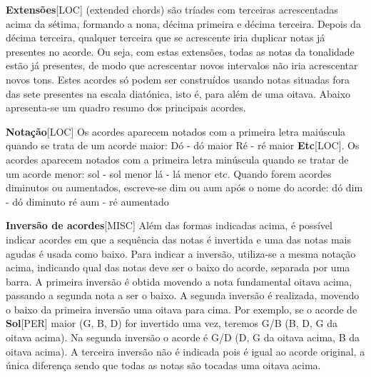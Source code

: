 \documentclass[a4paper,12pt]{article}
\begin{document}
\textbf{Extensões}\textsc{[LOC]} (extended chords) são tríades com terceiras acrescentadas acima da sétima, formando a nona, décima primeira e décima terceira. Depois da décima terceira, qualquer terceira que se acrescente iria duplicar notas já presentes no acorde. Ou seja, com estas extensões, todas as notas da tonalidade estão já presentes, de modo que acrescentar novos intervalos não iria acrescentar novos tons. Estes acordes só podem ser construídos usando notas situadas fora das sete presentes na escala diatónica, isto é, para além de uma oitava. Abaixo apresenta-se um quadro resumo dos principais acordes.

\textbf{Notação}\textsc{[LOC]} Os acordes aparecem notados com a primeira letra maiúscula quando se trata de um acorde maior: Dó - dó maior Ré - ré maior \textbf{Etc}\textsc{[LOC]}. Os acordes aparecem notados com a primeira letra minúscula quando se tratar de um acorde menor: sol - sol menor lá - lá menor etc. Quando forem acordes diminutos ou aumentados, escreve-se dim ou aum após o nome do acorde: dó dim - dó diminuto ré aum - ré aumentado

\textbf{Inversão de acordes}\textsc{[MISC]} Além das formas indicadas acima, é possível indicar acordes em que a sequência das notas é invertida e uma das notas mais agudas é usada como baixo. Para indicar a inversão, utiliza-se a mesma notação acima, indicando qual das notas deve ser o baixo do acorde, separada por uma barra. A primeira inversão é obtida movendo a nota fundamental oitava acima, passando a segunda nota a ser o baixo. A segunda inversão é realizada, movendo o baixo da primeira inversão uma oitava para cima. Por exemplo, se o acorde de \textbf{Sol}\textsc{[PER]} maior (G, B, D) for invertido uma vez, teremos G/B (B, D, G da oitava acima). Na segunda inversão o acorde é G/D (D, G da oitava acima, B da oitava acima). A terceira inversão não é indicada pois é igual ao acorde original, a única diferença sendo que todas as notas são tocadas uma oitava acima.
\end{document}
